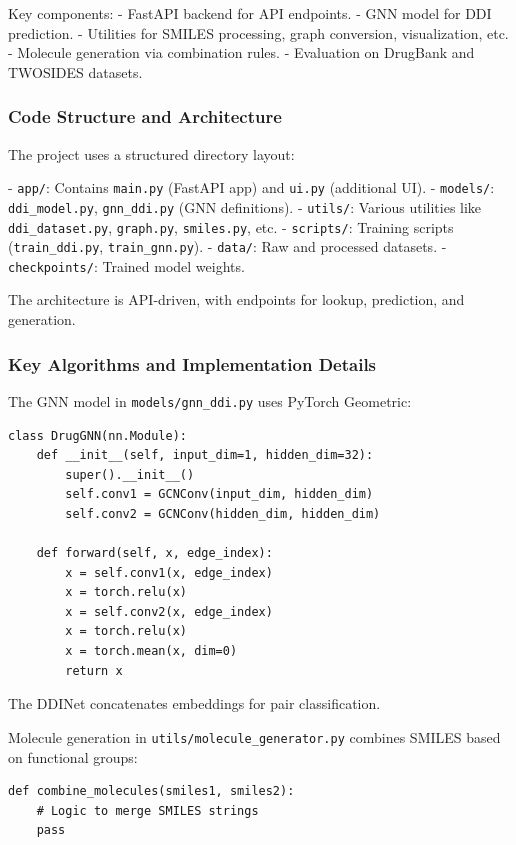 \documentclass[12pt,a4paper]{article}
\begin{document}
Key components:
- FastAPI backend for API endpoints.
- GNN model for DDI prediction.
- Utilities for SMILES processing, graph conversion, visualization, etc.
- Molecule generation via combination rules.
- Evaluation on DrugBank and TWOSIDES datasets.

\subsubsection{Code Structure and Architecture}
The project uses a structured directory layout:

- \texttt{app/}: Contains \texttt{main.py} (FastAPI app) and \texttt{ui.py} (additional UI).
- \texttt{models/}: \texttt{ddi\_model.py}, \texttt{gnn\_ddi.py} (GNN definitions).
- \texttt{utils/}: Various utilities like \texttt{ddi\_dataset.py}, \texttt{graph.py}, \texttt{smiles.py}, etc.
- \texttt{scripts/}: Training scripts (\texttt{train\_ddi.py}, \texttt{train\_gnn.py}).
- \texttt{data/}: Raw and processed datasets.
- \texttt{checkpoints/}: Trained model weights.

The architecture is API-driven, with endpoints for lookup, prediction, and generation.

\subsubsection{Key Algorithms and Implementation Details}
The GNN model in \texttt{models/gnn\_ddi.py} uses PyTorch Geometric:

\begin{lstlisting}
class DrugGNN(nn.Module):
    def __init__(self, input_dim=1, hidden_dim=32):
        super().__init__()
        self.conv1 = GCNConv(input_dim, hidden_dim)
        self.conv2 = GCNConv(hidden_dim, hidden_dim)

    def forward(self, x, edge_index):
        x = self.conv1(x, edge_index)
        x = torch.relu(x)
        x = self.conv2(x, edge_index)
        x = torch.relu(x)
        x = torch.mean(x, dim=0)
        return x
\end{lstlisting}

The DDINet concatenates embeddings for pair classification.

Molecule generation in \texttt{utils/molecule\_generator.py} combines SMILES based on functional groups:

\begin{lstlisting}
def combine_molecules(smiles1, smiles2):
    # Logic to merge SMILES strings
    pass
\end{lstlisting}
\end{document}
